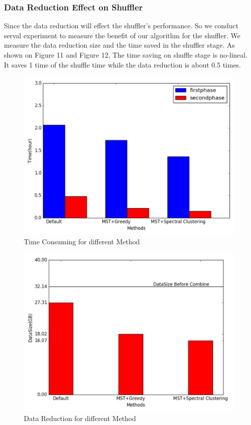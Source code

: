 \documentclass{vldb}
\begin{document}
\subsubsection{Data Reduction Effect on Shuffler}
Since the data reduction will effect the shuffler's performance. So we conduct serval experiment to measure the benefit of our algorithm for the shuffler. We measure the data reduction size and the time saved in the shuffler stage. As shown on Figure 11 and Figure 12, The time saving on shuffle stage is no-lineal. It saves 1 time of the shuffle time while the data reduction is about 0.5 times.

\begin{figure}
\centering
\includegraphics[scale=0.4]{FRunningTime}
\caption{Time Consuming for different Method}
\label{fig:RunningTime}
\end{figure}

\begin{figure}
\centering
\includegraphics[scale=0.4]{FDataSizeReduction}
\caption{Data Reduction for different Method}
\label{fig:DataSizeReduction}
\end{figure}
\end{document}
